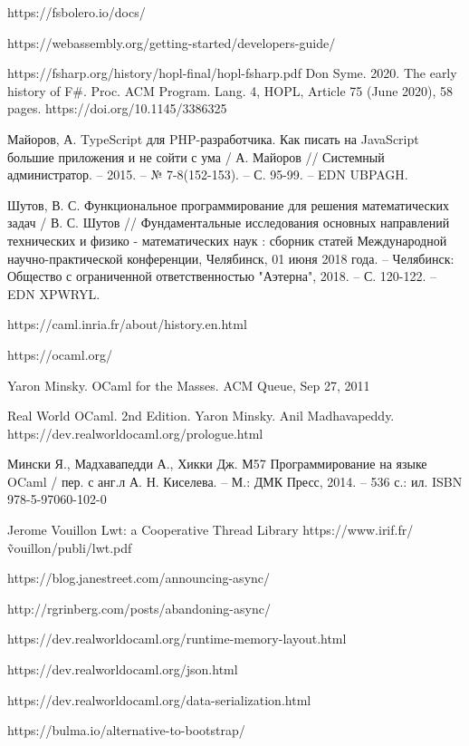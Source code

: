 \begin{thebibliography}{00}
    https://fsbolero.io/docs/ \TODO

    https://webassembly.org/getting-started/developers-guide/ \TODO

    https://fsharp.org/history/hopl-final/hopl-fsharp.pdf 
    Don Syme. 2020. The early history of F\#. Proc. ACM Program. Lang. 4, HOPL, Article 75 (June 2020), 58 pages. https://doi.org/10.1145/3386325
    \TODO

    Майоров, А. TypeScript для PHP-разработчика. Как писать на JavaScript большие приложения и не сойти с ума / 
    А. Майоров // Системный администратор. – 2015. – № 7-8(152-153). – С. 95-99. – EDN UBPAGH.

    Шутов, В. С. Функциональное программирование для решения математических задач 
    / В. С. Шутов // Фундаментальные исследования основных направлений технических и физико - математических наук 
    : сборник статей Международной научно-практической конференции, Челябинск, 01 июня 2018 года. 
    – Челябинск: Общество с ограниченной ответственностью "Аэтерна", 2018. – С. 120-122. – EDN XPWRYL.

    https://caml.inria.fr/about/history.en.html \TODO

    https://ocaml.org/ \TODO

    Yaron Minsky. OCaml for the Masses. ACM Queue, Sep 27, 2011 \TODO

    Real World OCaml. 2nd Edition. Yaron Minsky. Anil Madhavapeddy.
    https://dev.realworldocaml.org/prologue.html \TODO

    Мински Я., Мадхавапедди А., Хикки Дж.
    М57 Программирование на языке OCaml / пер. с анг.л А. Н. Киселева. –
    М.: ДМК Пресс, 2014. – 536 с.: ил.
    ISBN 978-5-97060-102-0
    \TODO

    Jerome Vouillon Lwt: a Cooperative Thread Library \TODO
    https://www.irif.fr/\~vouillon/publi/lwt.pdf

    https://blog.janestreet.com/announcing-async/ \TODO

    http://rgrinberg.com/posts/abandoning-async/ \TODO

    https://dev.realworldocaml.org/runtime-memory-layout.html \TODO

    https://dev.realworldocaml.org/json.html \TODO

    https://dev.realworldocaml.org/data-serialization.html \TODO

    https://bulma.io/alternative-to-bootstrap/ \TODO

\end{thebibliography}
\endgroup

